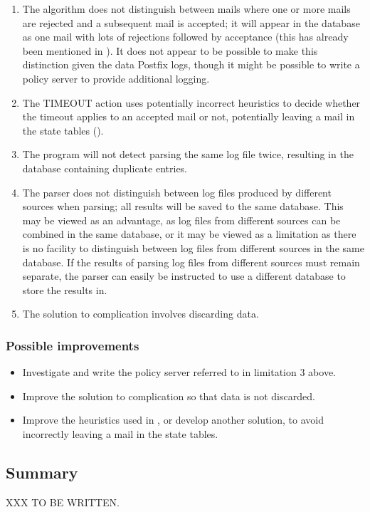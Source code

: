 \begin{enumerate}
    \item The algorithm does not distinguish between mails where one or
        more mails are rejected and a subsequent mail is accepted; it will
        appear in the database as one mail with lots of rejections followed
        by acceptance (this has already been mentioned in
        ).  It does not appear to be possible
        to make this distinction given the data Postfix logs, though it
        might be possible to write a policy server to provide additional
        logging.

    \item The TIMEOUT action uses potentially incorrect heuristics to
        decide whether the timeout applies to an accepted mail or not,
        potentially leaving a mail in the state tables
        ().

    \item The program will not detect parsing the same log file twice,
        resulting in the database containing duplicate entries.

    \item The parser does not distinguish between log files produced by
        different sources when parsing; all results will be saved to the
        same database.  This may be viewed as an advantage, as log files
        from different sources can be combined in the same database, or it
        may be viewed as a limitation as there is no facility to
        distinguish between log files from different sources in the same
        database.  If the results of parsing log files from different
        sources must remain separate, the parser can easily be instructed
        to use a different database to store the results in.

    \item The solution to complication  involves discarding data.

\end{enumerate}

\subsubsection{Possible improvements}

\begin{itemize}

    \item Investigate and write the policy server referred to in limitation
        3 above.

    \item Improve the solution to complication  so that data is not discarded.

    \item Improve the heuristics used in
        , or develop another
        solution, to avoid incorrectly leaving a mail in the state tables.

\end{itemize}


\subsection{Summary}

XXX TO BE WRITTEN\@.
